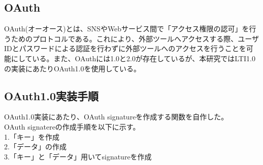 \subsection{OAuth}
OAuth(オーオース)とは、SNSやWebサービス間で「アクセス権限の認可」を行うためのプロトコルである。これにより、外部ツールへアクセスする際、ユーザIDとパスワードによる認証を行わずに外部ツールへのアクセスを行うことを可能にしている。また、OAuthには1.0と2.0が存在しているが、本研究ではLTI1.0の実装にあたりOAuth1.0を使用している。
\subsection{OAuth1.0実装手順}
OAuth1.0実装にあたり、OAuth signatureを作成する関数を自作した。\\
OAuth signatereの作成手順を以下に示す。\\
1.「キー」を作成\\
2.「データ」の作成\\
3.「キー」と「データ」用いてsignatureを作成\\
